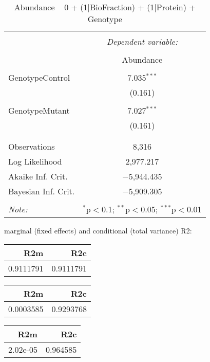 \documentclass[11pt]{report}
\begin{document}
\begin{table}[!htbp] \centering 
  \caption{Abundance ~ 0 + (1|BioFraction) + (1|Protein) + Genotype} 
  \label{} 
\begin{tabular}{@{\extracolsep{5pt}}lc} 
\\[-1.8ex]\hline 
\hline \\[-1.8ex] 
 & \multicolumn{1}{c}{\textit{Dependent variable:}} \\ 
\cline{2-2} 
\\[-1.8ex] & Abundance \\ 
\hline \\[-1.8ex] 
 GenotypeControl & 7.035$^{***}$ \\ 
  & (0.161) \\ 
  & \\ 
 GenotypeMutant & 7.027$^{***}$ \\ 
  & (0.161) \\ 
  & \\ 
\hline \\[-1.8ex] 
Observations & 8,316 \\ 
Log Likelihood & 2,977.217 \\ 
Akaike Inf. Crit. & $-$5,944.435 \\ 
Bayesian Inf. Crit. & $-$5,909.305 \\ 
\hline 
\hline \\[-1.8ex] 
\textit{Note:}  & \multicolumn{1}{r}{$^{*}$p$<$0.1; $^{**}$p$<$0.05; $^{***}$p$<$0.01} \\ 
\end{tabular} 
\end{table} 
marginal (fixed effects) and conditional (total variance) R2:

\begin{tabular}{r|r}
\hline
R2m & R2c\\
\hline
0.9111791 & 0.9111791\\
\hline
\end{tabular}

\begin{tabular}{r|r}
\hline
R2m & R2c\\
\hline
0.0003585 & 0.9293768\\
\hline
\end{tabular}

\begin{tabular}{r|r}
\hline
R2m & R2c\\
\hline
2.02e-05 & 0.964585\\
\hline
\end{tabular}
\end{document}
